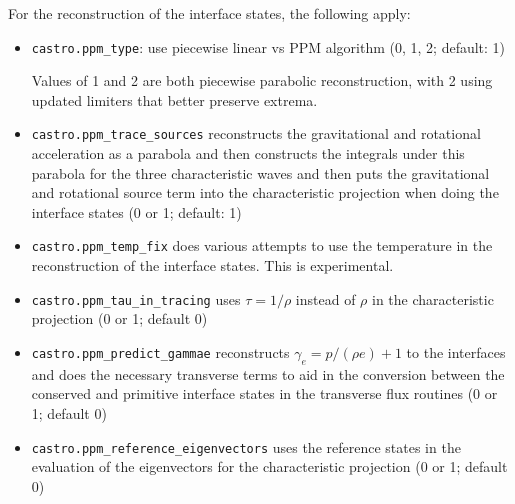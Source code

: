 For the reconstruction of the interface states, the following apply:
\begin{itemize}
\item {\tt castro.ppm\_type}: use piecewise linear vs PPM algorithm
  (0, 1, 2; default: 1)

  Values of 1 and 2 are both piecewise parabolic reconstruction, with
  2 using updated limiters that better preserve extrema.

\item {\tt castro.ppm\_trace\_sources} reconstructs the gravitational
  and rotational acceleration as a parabola and then constructs the
  integrals under this parabola for the three characteristic waves and
  then puts the gravitational and rotational source term into the
  characteristic projection when doing the interface states (0 or 1;
  default: 1)

\item {\tt castro.ppm\_temp\_fix} does various attempts to use the
  temperature in the reconstruction of the interface states.  This
  is experimental.

\item {\tt castro.ppm\_tau\_in\_tracing} uses $\tau = 1/\rho$ instead of
  $\rho$ in the characteristic projection (0 or 1; default 0)

\item {\tt castro.ppm\_predict\_gammae} reconstructs $\gamma_e = p/(\rho e) + 1$
  to the interfaces and does the necessary transverse terms to aid in
  the conversion between the conserved and primitive interface states
  in the transverse flux routines (0 or 1; default 0)

\item {\tt castro.ppm\_reference\_eigenvectors} uses the reference states in
  the evaluation of the eigenvectors for the characteristic projection
  (0 or 1; default 0)
\end{itemize}



